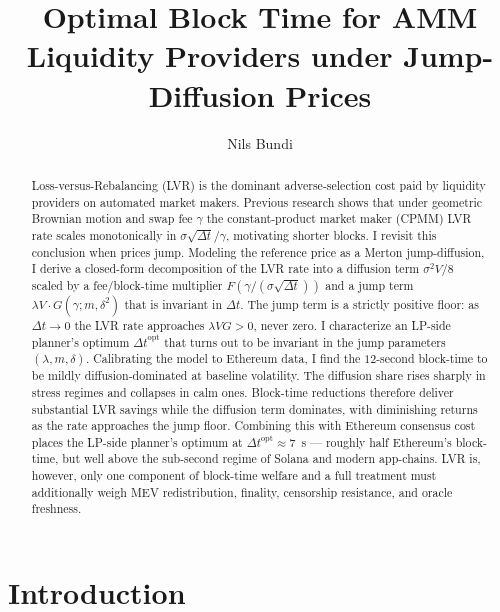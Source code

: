 \documentclass[runningheads]{llncs}
\title{Optimal Block Time for AMM\\ Liquidity Providers under Jump-Diffusion Prices}
\author{Nils Bundi}
\institute{Zurich University of Applied Sciences, Switzerland\\
\email{bund@zhaw.ch}}
\newcommand{\dt}{\Delta t}
\newcommand{\1}{\mathbf{1}}
\begin{document}
\maketitle

\begin{abstract}
Loss-versus-Rebalancing (LVR) is the dominant adverse-\linebreak selection cost paid by liquidity providers on automated market makers. Previous research shows that under geometric Brownian motion and swap fee $\gamma$ the constant-product market maker (CPMM) LVR rate scales monotonically in $\sigma\sqrt{\dt}/\gamma$, motivating shorter blocks. I revisit this conclusion when prices jump. Modeling the reference price as a Merton jump-diffusion, I derive a closed-form decomposition of the LVR rate into a diffusion term $\sigma^2 V/8$ scaled by a fee/block-time multiplier $F(\gamma/(\sigma\sqrt{\dt}))$ and a jump term $\lambda V\cdot G(\gamma;m,\delta^2)$ that is invariant in $\dt$. The jump term is a strictly positive floor: as $\dt\to 0$ the LVR rate approaches $\lambda V G > 0$, never zero. I characterize an LP-side planner's optimum $\dt^{\mathrm{opt}}$ that turns out to be invariant in the jump parameters $(\lambda,m,\delta)$. Calibrating the model to Ethereum data, I find the $12$-second block-time to be mildly diffusion-dominated at baseline volatility. The diffusion share rises sharply in stress regimes and collapses in calm ones. Block-time reductions therefore deliver substantial LVR savings while the diffusion term dominates, with diminishing returns as the rate approaches the jump floor. Combining this with Ethereum consensus cost places the LP-side planner's optimum at $\dt^{\mathrm{opt}} \approx 7$~s --- roughly half Ethereum's block-time, but well above the sub-second regime of Solana and modern app-chains. LVR is, however, only one component of block-time welfare and a full treatment must additionally weigh MEV redistribution, finality, censorship resistance, and oracle freshness.

\end{abstract}

\section{Introduction}\label{sec:intro}
\end{document}
